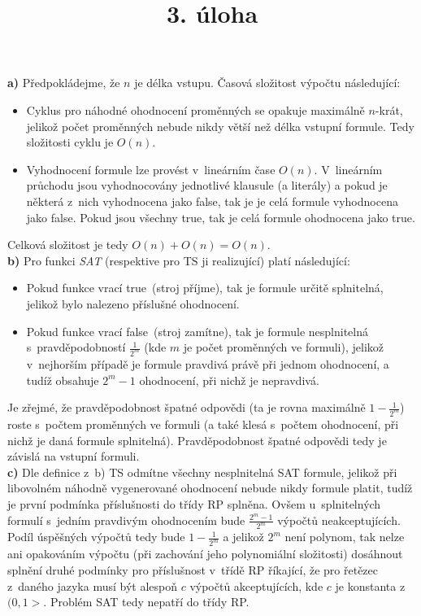 \documentclass[a4paper]{article}
\title {3. úloha}
\newcommand{\fls}{false}
\newcommand{\tre}{true}
\begin{document}
\section*{}
\textbf{a)} Předpokládejme, že $n$ je délka vstupu.
Časová složitost výpočtu následující:
\begin{itemize}
    \item Cyklus pro náhodné ohodnocení proměnných se opakuje maximálně $n$-krát, jelikož počet proměnných nebude nikdy větší než
     délka vstupní formule.
    Tedy složitosti cyklu je $O(n)$.
    \item Vyhodnocení formule lze provést v~lineárním čase $O(n)$.
    V~lineárním průchodu jsou vyhodnocovány jednotlivé klausule (a literály) a pokud je některá z~nich vyhodnocena jako \fls, tak je
    je celá formule vyhodnocena jako \fls.
    Pokud jsou všechny \tre, tak je celá formule ohodnocena jako \tre.
\end{itemize}
Celková složitost je tedy $O(n)+O(n)=O(n)$.
\\

\noindent\textbf{b)} Pro funkci \emph{SAT} (respektive pro TS ji realizující) platí následující:
\begin{itemize}
    \item Pokud funkce vrací \tre\ (stroj příjme), tak je formule určitě splnitelná, jelikož bylo nalezeno příslušné ohodnocení.
    \item Pokud funkce vrací \fls\ (stroj zamítne), tak je formule nesplnitelná s~pravděpodobností $\frac{1}{2^m}$ (kde $m$ je počet proměnných
    ve formuli), jelikož v~nejhorším případě je formule pravdivá právě při jednom ohodnocení, a tudíž obsahuje $2^m-1$ ohodnocení,
    při nichž je nepravdivá.
\end{itemize}
Je zřejmé, že pravděpodobnost špatné odpovědi (ta je rovna maximálně $1-\frac{1}{2^m}$) roste s~počtem proměnných ve formuli
(a také klesá s~počtem ohodnocení, při nichž je daná formule splnitelná).
Pravděpodobnost špatné odpovědi tedy je závislá na vstupní formuli.
\\

\noindent\textbf{c)} Dle definice z~b) TS odmítne všechny nesplnitelná SAT formule, jelikož při libovolném náhodně vygenerované ohodnocení nebude
nikdy formule platit, tudíž je první podmínka příslušnosti do třídy RP splněna.
Ovšem u~splnitelných formulí s~jedním pravdivým ohodnocením bude $\frac{2^m-1}{2^m}$ výpočtů neakceptujících.
Podíl úspěšných výpočtů tedy bude $1-\frac{1}{2^m}$ a jelikož $2^m$ není polynom, tak nelze ani opakováním výpočtu (při zachování jeho polynomiální složitosti) 
dosáhnout splnění druhé podmínky pro příslušnost v~třídě RP říkající,
že pro řetězec z~daného jazyka musí být alespoň $c$ výpočtů akceptujících, kde $c$ je konstanta z~$(0,1>$.
Problém SAT tedy nepatří do třídy RP.
\end{document}
